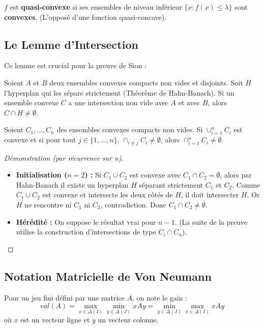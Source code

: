 \begin{definition}
$f$ est \textbf{quasi-convexe} si ses ensembles de niveau inférieur $\{x : f(x) \le \lambda\}$ sont \textbf{convexes}. (L'opposé d'une fonction quasi-concave).
\end{definition}

\subsection{Le Lemme d'Intersection}
Ce lemme est crucial pour la preuve de Sion :
\begin{lemme}
Soient $A$ et $B$ deux ensembles convexes compacts non vides et disjoints. Soit $H$ l'hyperplan qui les sépare strictement (Théorème de Hahn-Banach). Si un ensemble convexe $C$ a une intersection non vide avec $A$ et avec $B$, alors $C \cap H \neq \emptyset$.
\end{lemme}

\begin{lemme}[d'Intersection]
Soient $C_1, \dots, C_n$ des ensembles convexes compacts non vides. Si $\cup_{i=1}^n C_i$ est convexe et si pour tout $j \in \{1,\dots,n\}$, $\cap_{i \neq j} C_i \neq \emptyset$, alors $\cap_{i=1}^n C_i \neq \emptyset$.
\end{lemme}

\begin{proof}[Démonstration (par récurrence sur n)]
\begin{itemize}
    \item \textbf{Initialisation ($n=2$) :} Si $C_1 \cup C_2$ est convexe avec $C_1 \cap C_2 = \emptyset$, alors par Hahn-Banach il existe un hyperplan $H$ séparant strictement $C_1$ et $C_2$. Comme $C_1 \cup C_2$ est convexe et intersecte les deux côtés de $H$, il doit intersecter $H$. Or $H$ ne rencontre ni $C_1$ ni $C_2$, contradiction. Donc $C_1 \cap C_2 \neq \emptyset$.
    \item \textbf{Hérédité :} On suppose le résultat vrai pour $n-1$. (La suite de la preuve utilise la construction d'intersections de type $C_i \cap C_n$).
\end{itemize}
\end{proof}

\subsection{Notation Matricielle de Von Neumann}
Pour un jeu fini défini par une matrice $A$, on note le gain :
\[ val(A) = \max_{x \in \Delta(I)} \min_{y \in \Delta(J)} xAy = \min_{y \in \Delta(J)} \max_{x \in \Delta(I)} xAy \]
où $x$ est un vecteur ligne et $y$ un vecteur colonne.
